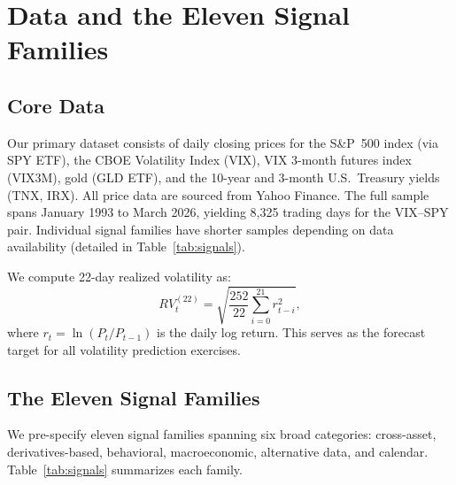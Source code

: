 \documentclass[12pt,a4paper]{article}
\begin{document}
\section{Data and the Eleven Signal Families}
\label{sec:data}

\subsection{Core Data}

Our primary dataset consists of daily closing prices for the S\&P~500 index (via SPY ETF), the CBOE Volatility Index (VIX), VIX 3-month futures index (VIX3M), gold (GLD ETF), and the 10-year and 3-month U.S.\ Treasury yields (TNX, IRX). All price data are sourced from Yahoo Finance. The full sample spans January 1993 to March 2026, yielding 8,325 trading days for the VIX--SPY pair. Individual signal families have shorter samples depending on data availability (detailed in Table~\ref{tab:signals}).

We compute 22-day realized volatility as:
\begin{equation}
RV_{t}^{(22)} = \sqrt{\frac{252}{22} \sum_{i=0}^{21} r_{t-i}^2},
\label{eq:rv}
\end{equation}
where $r_t = \ln(P_t/P_{t-1})$ is the daily log return. This serves as the forecast target for all volatility prediction exercises.

\subsection{The Eleven Signal Families}

We pre-specify eleven signal families spanning six broad categories: cross-asset, derivatives-based, behavioral, macroeconomic, alternative data, and calendar. Table~\ref{tab:signals} summarizes each family.
\end{document}
